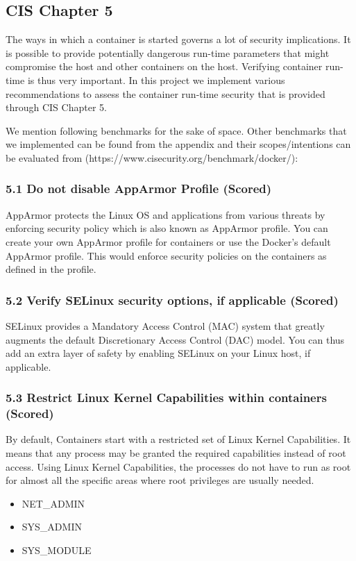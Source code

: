 \subsection*{CIS Chapter 5}
The ways in which a container is started governs a lot of security implications. It is possible
to provide potentially dangerous run-time parameters that might compromise the host and
other containers on the host. Verifying container run-time is thus very important. In this project we implement various
recommendations to assess the container run-time security that is provided through CIS Chapter 5.

We mention following benchmarks for the sake of space. Other benchmarks that we implemented can be found from the appendix and their scopes/intentions can be evaluated from (https://www.cisecurity.org/benchmark/docker/): 

 \subsubsection*{5.1 Do not disable AppArmor Profile (Scored)} 
AppArmor protects the Linux OS and applications from various threats by enforcing
security policy which is also known as AppArmor profile. You can create your own
AppArmor profile for containers or use the Docker's default AppArmor profile. This would
enforce security policies on the containers as defined in the profile.

\subsubsection*{5.2 Verify SELinux security options, if applicable (Scored)} SELinux provides a Mandatory Access Control (MAC) system that greatly augments the
default Discretionary Access Control (DAC) model. You can thus add an extra layer of safety
by enabling SELinux on your Linux host, if applicable.

\subsubsection*{5.3 Restrict Linux Kernel Capabilities within containers (Scored)} By default, Containers start with a restricted set of Linux Kernel Capabilities. It
means that any process may be granted the required capabilities instead of root access.
Using Linux Kernel Capabilities, the processes do not have to run as root for almost all the
specific areas where root privileges are usually needed. 
\begin{itemize}
    \item NET\_ADMIN
    \item SYS\_ADMIN
    \item SYS\_MODULE
\end{itemize}

